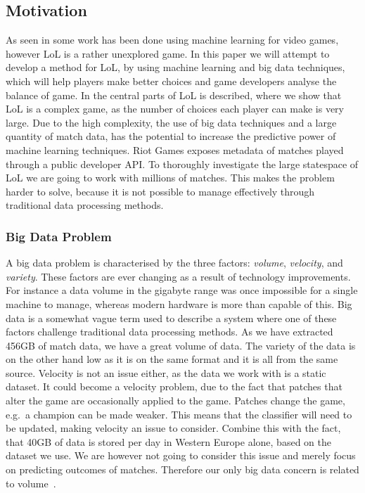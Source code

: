 \subsection{Motivation}\label{sec:motivation}
As seen in  some work has been done using machine learning for video games, however LoL is a rather unexplored game. 
In this paper we will attempt to develop a method for LoL, by using machine learning and big data techniques, which will help players make better choices and game developers analyse the balance of game. In  the central parts of LoL is described, where we show that LoL is a complex game, as the number of choices each player can make is very large. Due to the high complexity, the use of big data techniques and a large quantity of match data, has the potential to increase the predictive power of machine learning techniques. Riot Games exposes metadata of matches played through a public developer API. To thoroughly investigate the large statespace of LoL we are going to work with millions of matches. This makes the problem harder to solve, because it is not possible to manage effectively through traditional data processing methods.

\subsubsection{Big Data Problem}\label{sec:big_data_problem}
A big data problem is characterised by the three factors: \emph{volume}, \emph{velocity}, and \emph{variety}. These factors are ever changing as a result of technology improvements. For instance a data volume in the gigabyte range was once impossible for a single machine to manage, whereas modern hardware is more than capable of this. Big data is a somewhat vague term used to describe a system where one of these factors challenge traditional data processing methods. As we have extracted 456GB of match data, we have a great volume of data. The variety of the data is on the other hand low as it is on the same format and it is all from the same source. Velocity is not an issue either, as the data we work with is a static dataset. It could become a velocity problem, due to the fact that patches that alter the game are occasionally applied to the game. Patches change the game, e.g.\ a champion can be made weaker. This means that the classifier will need to be updated, making velocity an issue to consider. Combine this with the fact, that 40GB of data is stored per day in Western Europe alone, based on the dataset we use. We are however not going to consider this issue and merely focus on predicting outcomes of matches. Therefore our only big data concern is related to volume~\cite{madden2012databases}.

